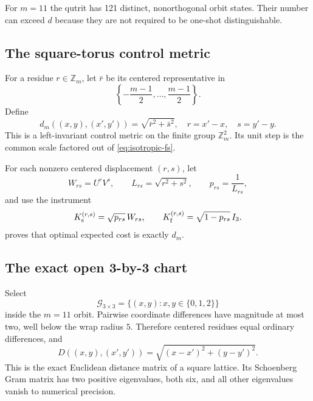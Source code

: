 \documentclass[11pt]{article}
\theoremstyle{definition}
\theoremstyle{remark}
\newcommand{\Z}{\mathbb Z}
\begin{document}
For $m=11$ the qutrit has 121 distinct, nonorthogonal orbit states. Their
number can exceed $d$ because they are not required to be one-shot
distinguishable.

\subsection{The square-torus control metric}

For a residue $r\in\Z_m$, let $\bar r$ be its centered representative in
\begin{equation}
 \left\{-\frac{m-1}{2},\ldots,\frac{m-1}{2}\right\}.
\end{equation}
Define
\begin{equation}
 d_m((x,y),(x',y'))
 =\sqrt{\bar r^2+\bar s^2},
 \quad r=x'-x,\quad s=y'-y.
 \label{eq:qutrit-torus-metric}
\end{equation}
This is a left-invariant control metric on the finite group $\Z_m^2$. Its
unit step is the common scale factored out of \cref{eq:isotropic-fs}.

For each nonzero centered displacement $(r,s)$, let
\begin{equation}
 W_{rs}=U^rV^s,\qquad
 L_{rs}=\sqrt{r^2+s^2},\qquad
 p_{rs}=\frac1{L_{rs}},
 \label{eq:qutrit-displacement}
\end{equation}
and use the instrument
\begin{equation}
 K_{\rm s}^{(r,s)}=\sqrt{p_{rs}}\,W_{rs},\qquad
 K_{\rm f}^{(r,s)}=\sqrt{1-p_{rs}}\,I_3.
 \label{eq:qutrit-retry}
\end{equation}
 proves that optimal expected cost is exactly
$d_m$.

\subsection{The exact open 3-by-3 chart}

Select
\begin{equation}
 \mathcal G_{3\times3}
 =\{(x,y):x,y\in\{0,1,2\}\}
 \label{eq:qutrit-patch}
\end{equation}
inside the $m=11$ orbit. Pairwise coordinate differences have magnitude at
most two, well below the wrap radius $5$. Therefore centered residues equal
ordinary differences, and
\begin{equation}
 \boxed{
 D((x,y),(x',y'))
 =\sqrt{(x-x')^2+(y-y')^2}
 }.
 \label{eq:qutrit-patch-distance}
\end{equation}
This is the exact Euclidean distance matrix of a square lattice. Its
Schoenberg Gram matrix has two positive eigenvalues, both six, and all other
eigenvalues vanish to numerical precision.
\end{document}
